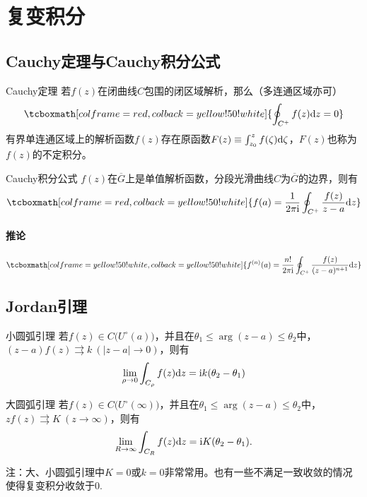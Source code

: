 \documentclass[UTF8,12pt]{ctexart}
\newcommand\stressbox{\tcboxmath[colframe=red,colback=yellow!50!white]}
\newcommand\stressarea{\tcboxmath[colframe=yellow!50!white,colback=yellow!50!white]}
\newcommand{\I}{{\rm i}}
\begin{document}
\newpage
\section{复变积分}
\subsection{Cauchy定理与Cauchy积分公式}

\begin{bbox}{Cauchy定理}
    若$f(z)$在闭曲线$C$包围的闭区域解析，那么（多连通区域亦可）
    \begin{equation}
        \stressbox{\oint_{C^+}f(z){\rm d}z=0}
    \end{equation}
    \tcbline
    有界单连通区域上的解析函数$f(z)$存在原函数$F(z)\equiv\int_{z_0}^zf(\zeta){\rm d}\zeta$，$F(z)$也称为$f(z)$的不定积分。
\end{bbox}

\begin{bbox}{Cauchy积分公式}
    $f(z)$在$\overline G$上是单值解析函数，分段光滑曲线$C$为$\overline G$的边界，则有
    \begin{equation}
        \stressbox{f(a)=\frac{1}{2\pi\I}\oint_{C^+}\frac{f(z)}{z-a}{\rm d}z}
    \end{equation}
    \paragraph*{推论}
    \begin{equation}
    \stressarea{f^{(n)}(a)=\frac{n!}{2\pi\I}\oint_{C^+}\frac{f(z)}{(z-a)^{n+1}}{\rm d}z}
    \end{equation}
\end{bbox}

\subsection{Jordan引理}
\setlength\columnsep{1.3cm}
\begin{multicols}{2}
\begin{wbox}{小圆弧引理}
    若$f(z)\in C\big(U^\circ(a)\big)$，并且在$\theta_1\leqslant\arg(z-a)\leqslant\theta_2$中，$(z-a)f(z)\rightrightarrows k\ (|z-a|\rightarrow 0)$，则有
    \begin{equation}
        \lim_{\rho\rightarrow 0}\int_{C_\rho}f(z){\rm d}z=\I k(\theta_2-\theta_1)
    \end{equation}
\end{wbox}

\begin{wbox}{大圆弧引理}
    若$f(z)\in C\big(U^\circ(\infty)\big)$，并且在$\theta_1\leqslant\arg(z-a)\leqslant\theta_2$中，$zf(z)\rightrightarrows K\ (z\rightarrow\infty)$，则有
    \begin{equation}
        \lim_{R\rightarrow\infty}\int_{C_R}f(z){\rm d}z=\I K(\theta_2-\theta_1).
    \end{equation}
\end{wbox}
\end{multicols}
\noindent 注：大、小圆弧引理中$K=0$或$k=0$非常常用。也有一些不满足一致收敛的情况使得复变积分收敛于0.
\end{document}
